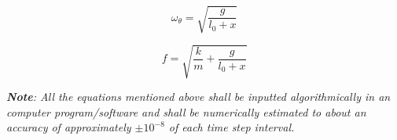     \begin{equation}
        \omega_\theta = \sqrt{\frac{g}{l_0 + x}}
        \label{eq6}
    \end{equation}
            
    \begin{equation}
        f = \sqrt{\frac{k}{m} + \frac{g}{l_0 + x}}
        \label{eq7}
    \end{equation}
            
\textit{\textbf{Note}: All the equations mentioned above shall be inputted algorithmically in an computer program/software and shall be numerically estimated to about an accuracy of approximately $\pm10^{-8}$ of each time step interval.}
            
            




